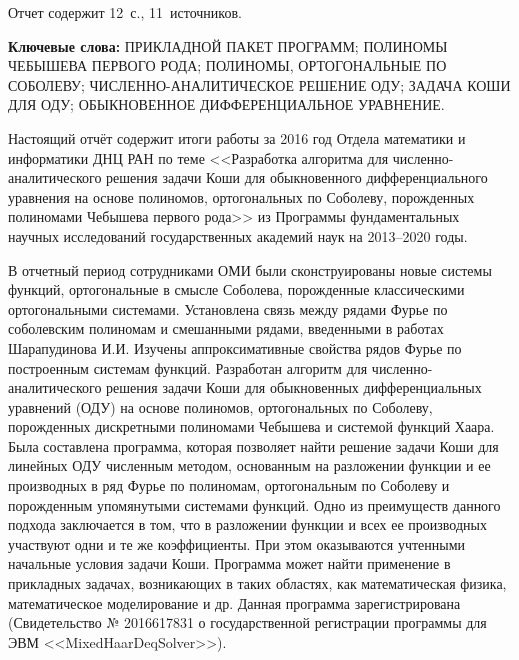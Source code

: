 \Referat %

Отчет содержит 12~с., 11~источников.

 \bigskip
 \textbf{ Ключевые
  слова:}
  ПРИКЛАДНОЙ ПАКЕТ ПРОГРАММ;
  ПОЛИНОМЫ ЧЕБЫШЕВА ПЕРВОГО РОДА;
  ПОЛИНОМЫ, ОРТОГОНАЛЬНЫЕ ПО СОБОЛЕВУ;
  ЧИСЛЕННО-АНАЛИТИЧЕСКОЕ РЕШЕНИЕ ОДУ;
  ЗАДАЧА КОШИ ДЛЯ ОДУ;
  ОБЫКНОВЕННОЕ ДИФФЕРЕНЦИАЛЬНОЕ УРАВНЕНИЕ.


 \bigskip

Настоящий отчёт содержит итоги работы за 2016 год Отдела математики и информатики ДНЦ РАН по теме
<<Разработка алгоритма для численно-аналитического решения задачи Коши для обыкновенного дифференциального уравнения на основе полиномов, ортогональных по Соболеву, порожденных полиномами Чебышева первого рода>>
из Программы фундаментальных научных исследований государственных академий наук на 2013–2020 годы.


В отчетный период сотрудниками ОМИ были сконструированы новые системы функций, ортогональные в смысле Соболева, порожденные классическими ортогональными системами. Установлена связь между рядами Фурье по соболевским полиномам и смешанными рядами, введенными в работах Шарапудинова И.И. Изучены аппроксимативные свойства рядов Фурье по построенным системам функций. Разработан алгоритм для численно-аналитического решения задачи Коши для обыкновенных дифференциальных уравнений (ОДУ) на основе полиномов, ортогональных по Соболеву, порожденных дискретными полиномами Чебышева и системой функций Хаара. Была составлена программа, которая позволяет найти решение задачи Коши для линейных ОДУ численным методом, основанным
на разложении функции и ее производных в ряд Фурье по полиномам, ортогональным по Соболеву и порожденным упомянутыми системами функций. Одно из преимуществ данного подхода заключается в том, что в разложении  функции и всех ее производных участвуют одни и те же коэффициенты. При этом
оказываются учтенными начальные условия задачи Коши. Программа может найти применение в прикладных задачах, возникающих в таких областях, как математическая физика, математическое моделирование и др. Данная программа зарегистрирована (Свидетельство № 2016617831 о государственной регистрации программы для ЭВМ <<MixedHaarDeqSolver>>).



